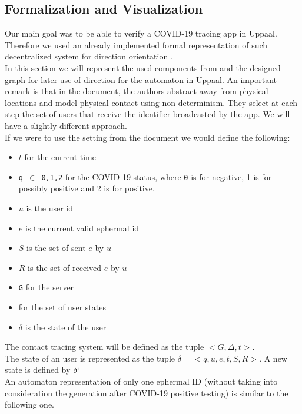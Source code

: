 \documentclass[a4paper, twocolumn]{article}
\begin{document}
\subsection{Formalization and Visualization} \label{formVis}
Our main goal was to be able to verify a COVID-19 tracing app in Uppaal. Therefore we used an already implemented formal representation of such decentralized system for direction orientation \cite{formalization}.\\
In this section we will represent the used components from \cite{formalization} and the designed graph for later use of direction for the automaton in Uppaal. An important remark is that in the document, the authors abstract away from physical locations and model physical contact using non-determinism. They select at each step the set of users that receive the identifier broadcasted by the app. We will have a slightly different approach.\\
If we were to use the setting from the document we would define the following:
\begin{itemize}

    \item \texttt{$t$} for the current time
    \item \texttt{q $\in$ {0,1,2}} for the COVID-19 status, where \texttt{0} is for negative, 1 is for possibly positive and 2 is for positive.
    \item \texttt{$u$} is the user id
    \item \texttt{$e$} is the current valid ephermal id
    \item \texttt{$S$} is the set of sent \texttt{$e$} by \texttt{$u$} 
    \item \texttt{$R$} is the set of received \texttt{$e$} by \texttt{$u$} 
    \item \texttt{G} for the server
    \item \text{$\Delta$} for the set of user states
    \item \texttt{$\delta$} is the state of the user
\end{itemize}
The contact tracing system will be defined as the tuple \colorbox{backcolour}{$< G, \Delta, t >$}.\\
The state of an user is represented as the tuple \colorbox{backcolour}{$\delta = < q,u,e,t,S,R >$}. A new state is defined by \texttt{$\delta`$}\\
An automaton representation of only one ephermal ID (without taking into consideration the generation after COVID-19 positive testing) is similar to the following one.\\
\end{document}

